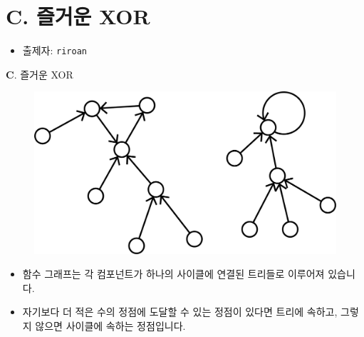 \section{C. 즐거운 XOR}

\begin{frame} %
    \begin{itemize}
        \item 출제자: \texttt{riroan}
    \end{itemize}
\end{frame}

\begin{frame}{\textbf{C}. 즐거운 XOR}
    \begin{figure}[h!]
        \centering
        \includegraphics[width=0.5\linewidth]{../images/function-restore/fx-1n.png}
    \end{figure}
    \begin{itemize}
        \item 함수 그래프는 각 컴포넌트가 하나의 사이클에 연결된 트리들로 이루어져 있습니다.
        \item 자기보다 더 적은 수의 정점에 도달할 수 있는 정점이 있다면 트리에 속하고, 그렇지 않으면 사이클에 속하는 정점입니다.
    \end{itemize}
\end{frame}